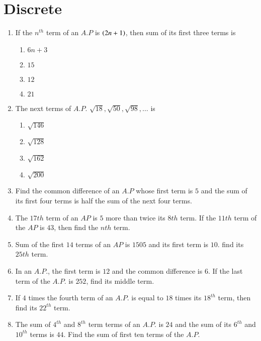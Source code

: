 \documentclass[journal,12pt,onecolumn]{IEEEtran}
\theoremstyle{remark}
\begin{document}
\section{Discrete}
\begin{enumerate}
\item If the $n^{th}$ term of an $A.P$ is $\left(2n+1\right)$, then sum of its first three terms is\\
\begin{enumerate}
\item $6n + 3$\\
\item $15$\\
\item $12$\\
\item $21$\\
\end{enumerate}
\item The next terms of $A.P.$ $\sqrt {18}, \sqrt {50}, \sqrt {98}, \ldots$ is\\
\begin{enumerate}
\item $\sqrt {146}$\\
\item $\sqrt {128}$\\
\item $\sqrt {162}$\\
\item $\sqrt {200}$\\
\end{enumerate}
\item Find the common difference of an $A.P$ whose first term is $5$ and the sum of its first four terms is half the sum of the next four terms.\\
\item The $17th$ term of an $AP$ is $5$ more than twice its $8th$ term. If the $11th$ term of the $AP$ is $43$, then find the $nth$ term.\\

\item Sum of the first $14$ terms of an $AP$ is $1505$ and its first term is $10$. find its $25th$ term.\\
\item In an $A.P.$, the first term is $12$ and the common difference is $6$. If the last term of the $A.P.$ is $252$, find its middle term.\\
\item If $4$ times the fourth term of an $A.P.$ is equal to $18$ times its $18^{th}$ term, then find its $22^{th}$ term.\\
\item The sum of $4^{th}$ and $8^{th}$ term terms of an $A.P.$ is $24$ and the sum of its $6^{th}$ and $10^{th}$ terms is $44$. Find the sum of first ten terms of the $A.P.$\\
\end{enumerate}
\end{document}
